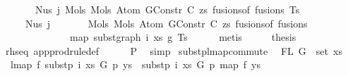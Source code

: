 \begin{isabellebody}
\ \ \ \ \ \ \ {\isacharparenleft}{\kern0pt}Nus{}\ j\ {\isacharparenleft}{\kern0pt}Mols{}\ {\isacharparenleft}{\kern0pt}Mols{}\ {\isacharparenleft}{\kern0pt}Atom\ {\isacharparenleft}{\kern0pt}GConstr\ C{\isacharparenright}{\kern0pt}\ zs{\isacharparenright}{\kern0pt}\ {\isacharparenleft}{\kern0pt}fusions{\isacharunderscore}{\kern0pt}of\ fusions{\isacharparenright}{\kern0pt}{\isacharparenright}{\kern0pt}\ Ts{\isacharparenright}{\kern0pt}{\isacharparenright}{\kern0pt}\ {\isacharequal}{\kern0pt}\isanewline
\ \ \ \ \ Nus{}\ j\isanewline
\ \ \ \ \ \ \ {\isacharparenleft}{\kern0pt}Mols{}\ {\isacharparenleft}{\kern0pt}Mols{}\ {\isacharparenleft}{\kern0pt}Atom\ {\isacharparenleft}{\kern0pt}GConstr\ C{\isacharparenright}{\kern0pt}\ zs{\isacharparenright}{\kern0pt}\ {\isacharparenleft}{\kern0pt}fusions{\isacharunderscore}{\kern0pt}of\ fusions{\isacharparenright}{\kern0pt}{\isacharparenright}{\kern0pt}\isanewline
\ \ \ \ \ \ \ \ \ \ \ \ \ \ {\isacharparenleft}{\kern0pt}map\ {\isacharparenleft}{\kern0pt}subst{\isacharunderscore}{\kern0pt}graph\ i\ xs\ g{}{\isacharparenright}{\kern0pt}\ Ts{\isacharparenright}{\kern0pt}{\isacharparenright}{\kern0pt}{\isachardoublequoteclose}\isanewline
\ \ \ \ \isamarkupfalse%
\ metis\isanewline
\ \ \isamarkupfalse%
\ \isamarkupfalse%
\ {\isacharquery}{\kern0pt}thesis\isanewline
\ \ \ \ \isamarkupfalse%
\ rhs{\isacharunderscore}{\kern0pt}eq\ app{\isacharunderscore}{\kern0pt}prodrule{\isacharunderscore}{\kern0pt}def\isanewline
\ \ \ \ \isamarkupfalse%
\ P{}\ \isamarkupfalse%
\ simp\isanewline
{}\isamarkupfalse%
%
\endisatagproof
{\isafoldproof}%
%
\isadelimproof
%
\endisadelimproof
%
\isadelimdocument
%
\endisadelimdocument
%
\isatagdocument
%
\isamarkuptrue%
%
\endisatagdocument
{\isafolddocument}%
%
\isadelimdocument
%
\endisadelimdocument
{}\isamarkupfalse%
\ subst{\isacharunderscore}{\kern0pt}p{\isacharunderscore}{\kern0pt}lmap{\isacharunderscore}{\kern0pt}commute{\isacharcolon}{\kern0pt}\isanewline
\ \ {\isachardoublequoteopen}FL\ G\ {\isasymsubseteq}\ set\ xs{\isachardoublequoteclose}\isanewline
\ \ {\isachardoublequoteopen}lmap\ f\ {\isacharparenleft}{\kern0pt}subst{\isacharunderscore}{\kern0pt}p\ i\ xs\ G\ p\ ys{\isacharparenright}{\kern0pt}\ {\isacharequal}{\kern0pt}\ subst{\isacharunderscore}{\kern0pt}p\ i\ xs\ G\ p\ {\isacharparenleft}{\kern0pt}map\ f\ ys{\isacharparenright}{\kern0pt}{\isachardoublequoteclose}\isanewline

\end{isabellebody}

